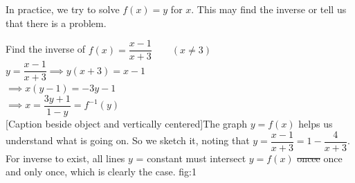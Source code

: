 In practice, we try to solve $f(x) = y$ for $x$. This may find the inverse or tell us that there is a problem.\\

\begin{example} Find the inverse of $f(x) = \dfrac{x-1}{x+3} \qquad (x \neq 3)$\\

$y = \dfrac{x-1}{x+3} \implies y(x+3) = x-1$\\

$\implies x(y-1) = -3y-1 $\\

$\implies x = \dfrac{3y+1}{1-y} = f^{-1}(y)$\\


[Caption beside object and vertically centered]{The graph $y = f(x)$ helps us understand what is going on. So we sketch it, noting that $y = \dfrac{x-1}{x+3} = 1 - \dfrac{4}{x+3}$. For inverse to exist, all lines $y$ = constant must intersect $y = f(x)$ \sout{oncee} once and only once, which is clearly the case.
}{fig:1}


\end{example}



